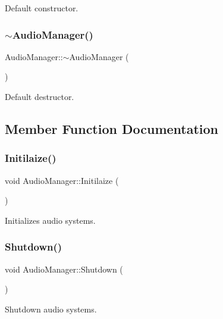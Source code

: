 Default constructor. \mbox{\label{class_audio_manager_ad94dc46723c6d7cf8c81fc3772a842aa}} 
\subsubsection{\texorpdfstring{$\sim$\+Audio\+Manager()}{~AudioManager()}}
{\footnotesize\ttfamily Audio\+Manager\+::$\sim$\+Audio\+Manager (\begin{DoxyParamCaption}{ }\end{DoxyParamCaption})}

Default destructor. 

\subsection{Member Function Documentation}
\mbox{\label{class_audio_manager_a503509b0f62bd768f59f543bd52687d6}} 
\subsubsection{\texorpdfstring{Initilaize()}{Initilaize()}}
{\footnotesize\ttfamily void Audio\+Manager\+::\+Initilaize (\begin{DoxyParamCaption}{ }\end{DoxyParamCaption})}

Initializes audio systems. \mbox{\label{class_audio_manager_a8956677aeb7abb69b5254c2a89315f9f}} 
\subsubsection{\texorpdfstring{Shutdown()}{Shutdown()}}
{\footnotesize\ttfamily void Audio\+Manager\+::\+Shutdown (\begin{DoxyParamCaption}{ }\end{DoxyParamCaption})}

Shutdown audio systems. \mbox{\label{class_audio_manager_a4dad07a2544905f1fd94fb4e2e4a34fc}} 
